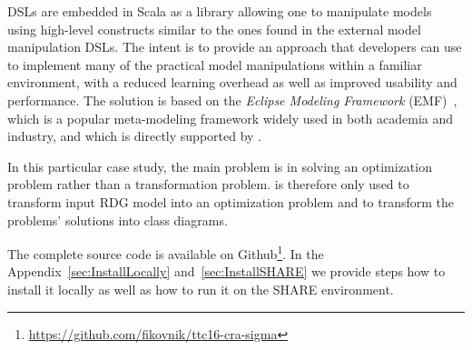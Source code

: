 \SIGMA DSLs are embedded in Scala as a library allowing one to manipulate models using high-level constructs similar to the ones found in the external model manipulation DSLs.
The intent is to provide an approach that developers can use to implement many of the practical model manipulations within a familiar environment, with a reduced learning overhead as well as improved usability and performance.
The solution is based on the \emph{Eclipse Modeling Framework} (EMF)~\cite{EMF}, which is a popular meta-modeling framework widely used in both academia and industry, and which is directly supported by \SIGMA.

In this particular \TTC case study, the main problem is in solving an optimization problem rather than a transformation problem.
\SIGMA is therefore only used to transform input RDG model into an optimization problem and to transform the problems' solutions into class diagrams.

The complete source code is available on Github\footnote{\url{https://github.com/fikovnik/ttc16-cra-sigma}}.
In the Appendix~\ref{sec:InstallLocally} and~\ref{sec:InstallSHARE} we provide steps how to install it locally as well as how to run it on the SHARE environment.